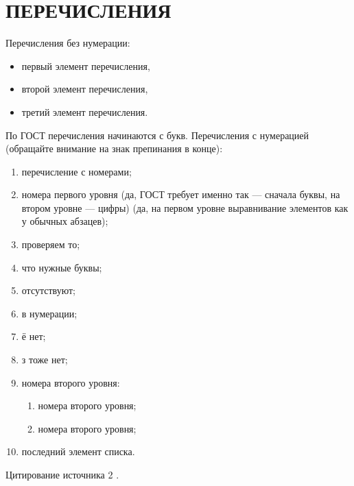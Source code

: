 \section{ПЕРЕЧИСЛЕНИЯ}

Перечисления без нумерации:

\begin{itemize}
    \item первый элемент перечисления,
    \item второй элемент перечисления,
    \item третий элемент перечисления.
\end{itemize}

По ГОСТ перечисления начинаются с букв.
Перечисления с нумерацией (обращайте внимание на знак препинания в конце):

\begin{enumerate}
    \item перечисление с номерами;
    \item номера первого уровня (да, ГОСТ требует именно так --- сначала буквы, 
    на втором уровне --- цифры)
    (да, на первом уровне выравнивание элементов как у обычных абзацев);
    \item проверяем то;
    \item что нужные буквы;
    \item отсутствуют;
    \item в нумерации;
    \item ё нет;
    \item з тоже нет;
    \item номера второго уровня:
        \begin{enumerate}
            \item номера второго уровня;
            \item номера второго уровня;
        \end{enumerate}
    \item последний элемент списка.
\end{enumerate}

Цитирование источника 2 \cite{Article3}.
